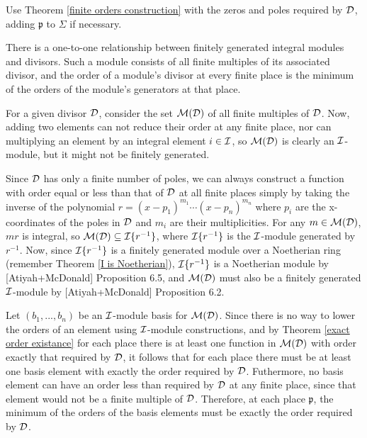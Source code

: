 \proof

Use Theorem \ref{finite orders construction} with the zeros and poles
required by ${\cal D}$, adding $\mathfrak{p}$
to $\Sigma$ if necessary.

\endtheorem

\theorem
\label{divisor-module isomorphism}

There is a one-to-one relationship between finitely generated integral
modules and divisors.  Such a module consists of all finite multiples
of its associated divisor, and the order of a module's divisor at
every finite place is the minimum of the orders of the module's
generators at that place.

\proof

For a given divisor ${\cal D}$, consider the set ${\cal M}({\cal D})$
of all finite multiples of ${\cal D}$.
Now, adding two
elements can not reduce their order at any finite place, nor can
multiplying an element by an integral element $i \in {\cal I}$, so
${\cal M}({\cal D})$ is clearly an ${\cal I}$-module, but it
might not be finitely generated.

Since ${\cal D}$ has only a finite number of poles, we can always
construct a function with order equal or less than that of ${\cal D}$
at all finite places simply by taking the inverse of the polynomial
$r=(x-p_1)^{m_1} \cdots (x-p_n)^{m_n}$ where $p_i$ are the x-coordinates
of the poles in ${\cal D}$ and $m_i$ are their multiplicities.
For any $m \in {\cal M}({\cal D})$, $mr$ is integral, so ${\cal M}({\cal D})
\subseteq {\cal I}\{r^{-1}\}$, where ${\cal I}\{r^{-1}\}$ is the ${\cal I}$-module
generated by $r^{-1}$.  Now, since ${\cal I}\{r^{-1}\}$ is a finitely
generated module over a Noetherian ring (remember Theorem \ref{I is
Noetherian}), ${\cal I}\{r^{-1}\}$ is a Noetherian module by
[Atiyah+McDonald] Proposition 6.5, and ${\cal M}({\cal D})$ must also
be a finitely generated ${\cal I}$-module by [Atiyah+McDonald]
Proposition 6.2.

Let $(b_1,...,b_n)$ be an ${\cal I}$-module basis for ${\cal M}({\cal
D})$.  Since there is no way to lower the orders of an element using
${\cal I}$-module constructions, and by Theorem \ref{exact order
existance} for each place there is at least one function in ${\cal
M}({\cal D})$ with order exactly that required by ${\cal D}$, it
follows that for each place there must be at least one basis element
with exactly the order required by ${\cal D}$.  Futhermore, no basis
element can have an order less than required by ${\cal D}$ at any
finite place, since that element would not be a finite multiple of
${\cal D}$.  Therefore, at each place $\mathfrak{p}$, the minimum of
the orders of the basis elements must be exactly the order required by
${\cal D}$.

